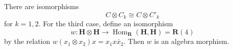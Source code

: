 There are isomorphisms
$$C \otimes C_k \cong C \otimes C'_k$$
for $k = 1, 2$. For the third case, define an isomorphism
$$w: \mathbf{H} \otimes \mathbf{H} \rightarrow \operatorname{Hom}_{\mathbf{R}}(\mathbf{H}, \mathbf{H}) = \mathbf{R}(4)$$
by the relation $w(x_1 \otimes x_2)x = x_1 x \bar{x}_2$. Then $w$ is an algebra morphism.
